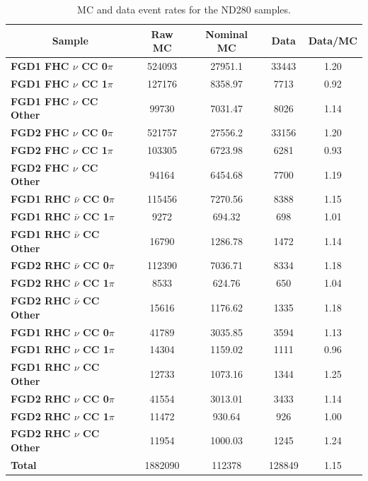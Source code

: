 \begin{center}
\begin{table}
\center
\begin{tabular}{l||c|c|c|c}
\hline \hline
\multicolumn{1}{c||}{\textbf{Sample}} & \textbf{Raw MC} & \textbf{Nominal MC} & \textbf{Data} & \textbf{Data/MC} \\
\hline
\hline
\textbf{FGD1 FHC $\nu$ CC 0$\pi$} & 524093 & 27951.1 & 33443 & 1.20 \\ 
\textbf{FGD1 FHC $\nu$ CC 1$\pi$} & 127176 & 8358.97 & 7713 & 0.92 \\ 
\textbf{FGD1 FHC $\nu$ CC Other} & 99730 & 7031.47 & 8026 & 1.14 \\ \hline
\textbf{FGD2 FHC $\nu$ CC 0$\pi$} & 521757 & 27556.2 & 33156 & 1.20 \\
\textbf{FGD2 FHC $\nu$ CC 1$\pi$} & 103305 & 6723.98 & 6281 & 0.93\\
\textbf{FGD2 FHC $\nu$ CC Other} & 94164 & 6454.68 & 7700 & 1.19 \\ \hline
\textbf{FGD1 RHC $\bar{\nu}$ CC 0$\pi$} & 115456 & 7270.56 & 8388 & 1.15\\
\textbf{FGD1 RHC $\bar{\nu}$ CC 1$\pi$} & 9272 & 694.32 & 698 & 1.01\\
\textbf{FGD1 RHC $\bar{\nu}$ CC Other} & 16790 & 1286.78 & 1472 & 1.14\\ \hline
\textbf{FGD2 RHC $\bar{\nu}$ CC 0$\pi$} & 112390 & 7036.71 & 8334 & 1.18\\
\textbf{FGD2 RHC $\bar{\nu}$ CC 1$\pi$} & 8533 & 624.76 & 650 & 1.04\\
\textbf{FGD2 RHC $\bar{\nu}$ CC Other} & 15616 & 1176.62 & 1335 & 1.18\\ \hline
\textbf{FGD1 RHC $\nu$ CC 0$\pi$} & 41789 & 3035.85 & 3594 & 1.13\\
\textbf{FGD1 RHC $\nu$ CC 1$\pi$} & 14304 & 1159.02 & 1111 & 0.96\\
\textbf{FGD1 RHC $\nu$ CC Other} & 12733 & 1073.16 & 1344 & 1.25\\ \hline
\textbf{FGD2 RHC $\nu$ CC 0$\pi$} & 41554 & 3013.01 & 3433 & 1.14\\
\textbf{FGD2 RHC $\nu$ CC 1$\pi$} & 11472 & 930.64 & 926 & 1.00\\ 
\textbf{FGD2 RHC $\nu$ CC Other} & 11954 & 1000.03 & 1245 & 1.24\\ \hline
\textbf{Total} & 1882090 & 112378 & 128849 & 1.15\\ \hline\hline
\end{tabular}
\caption{MC and data event rates for the ND280 samples.}
\label{tab:nomrates}
\end{table}
\end{center}

